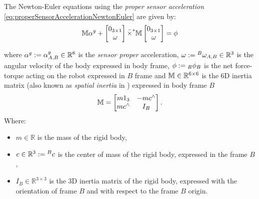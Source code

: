 

The Newton-Euler equations using the \emph{proper sensor acceleration} \eqref{eq:properSensorAccelerationNewtonEuler} are given by:
\begin{equation}
\label{eq:newtonEuler}
\mathbb{M} \alpha^g 
+ 
\begin{bmatrix} 0_{3 \times 1} \\ \omega \end{bmatrix}
\bar{\times}^* \mathbb{M} 
\begin{bmatrix} 0_{3 \times 1} \\ \omega \end{bmatrix}
= \phi
\end{equation}

where $\alpha^g := \alpha^g_{A,B} \in \mathbb{R}^6$ is the \emph{sensor proper} acceleration, 
$\omega := \hspace{0em}^B \omega_{A,B} \in \mathbb{R}^3$ is the angular velocity of the body expressed in body frame, $\phi := \hspace{0em}_B\phi_{B}$ is the net force-torque acting on the robot expressed in $B$ frame and
$\mathbb{M} \in \mathbb{R}^{6 \times 6}$ is the 6D inertia matrix (also known as \emph{spatial inertia} in \cite{featherstone2008}) expressed in body frame $B$
\begin{equation}
    \mathbb{M} = \begin{bmatrix} m 1_{3} & -m c^\wedge \\ 
                        m c^\wedge           & {I}_B 
        \end{bmatrix}.
\end{equation}
Where:
\begin{itemize}
    \item $m \in \mathbb{R}$ is the mass of the rigid body,
    \item $c \in \mathbb{R}^3 := \hspace{0em}^B c$ is the center of mass of the rigid body, expressed in the frame $B$,
    \item $I_B \in \mathbb{R}^{3\times3}$ is the 3D inertia matrix of the rigid body, expressed with the orientation of frame $B$ and with respect to the frame $B$ origin. 
\end{itemize} 

